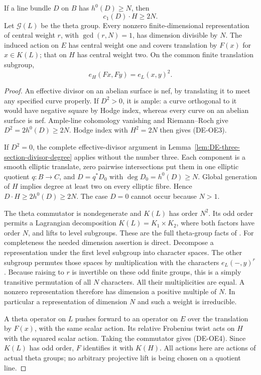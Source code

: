 \begin{lemma}
\label{lem:DE-odd-theta-section-degree}
If a line bundle \(D\) on \(B\) has \(h^0(D)\ge N\), then
\[
                         c_1(D)\cdot H\ge2N.
 \tag{DE-OE3}
\]
Let \(\mathcal G(L)\) be the theta group. Every nonzero
finite-dimensional representation of central weight \(r\), with
\(\gcd(r,N)=1\), has dimension divisible by \(N\).
The induced action on \(E\) has central weight one and covers
translation by \(F(x)\) for \(x\in K(L)\); that on \(H\)
has central weight two. On the common finite translation subgroup,
\[
                 e_H(Fx,Fy)=e_L(x,y)^2.
 \tag{DE-OE4}
\]
\end{lemma}
\begin{proof}
An effective divisor on an abelian surface is nef, by translating
it to meet any specified curve properly. If \(D^2>0\), it is
ample: a curve orthogonal to it would have negative square by
Hodge index, whereas every curve on an abelian surface is nef.
Ample-line cohomology vanishing and Riemann--Roch give
\(D^2=2h^0(D)\ge2N\). Hodge index with \(H^2=2N\)
then gives (DE-OE3).

If \(D^2=0\), the complete effective-divisor argument in
Lemma~\ref{lem:DE-three-section-divisor-degree} applies without
the number three. Each component is a smooth elliptic translate,
zero pairwise intersections put them in one elliptic quotient
\(q:B\to C\), and \(D=q^*D_0\) with
\(\deg D_0=h^0(D)\ge N\). Global generation of \(H\)
implies degree at least two on every elliptic fibre. Hence
\(D\cdot H\ge2h^0(D)\ge2N\). The case \(D=0\)
cannot occur because \(N>1\).

The theta commutator is nondegenerate and \(K(L)\) has order
\(N^2\). Its odd order permits a Lagrangian decomposition
\(K(L)=K_1\times K_2\), where both factors have order \(N\),
and lifts to level subgroups. These are the full theta-group facts
of \citep[Proposition~8.19, Corollary~8.20, Lemma~8.24 and
Theorem~8.28 with proofs, pp.~119--123]{EdixhovenVanDerGeerMoonenAV}.
For completeness the needed dimension assertion is direct.
Decompose a representation under the first level subgroup into
character spaces. The other subgroup permutes those spaces by
multiplication with the characters \(e_L(-,y)^r\).
Because raising to \(r\) is invertible on these odd finite
groups, this is a simply transitive permutation of all \(N\)
characters. All their multiplicities are equal. A nonzero
representation therefore has dimension a positive multiple of
\(N\). In particular a representation of dimension \(N\)
and such a weight is irreducible.

A theta operator on \(L\) pushes forward to an operator on
\(E\) over the translation by \(F(x)\), with the same scalar
action. Its relative Frobenius twist acts on \(H\) with the
squared scalar action. Taking the commutator gives (DE-OE4).
Since \(K(L)\) has odd order, \(F\) identifies it with
\(K(H)\). All actions here are actions of actual theta groups;
no arbitrary projective lift is being chosen on a quotient line.
\end{proof}

